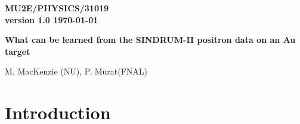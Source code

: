 \documentclass[12pt]{article}
\newcommand {\mumepconv}[1][A] {%
  \def\ArgI{{#1}}%
  \mumepconvRelay
}
\newcommand \mumepconvRelay[1][A]  {\mbox{$\mu^- \textrm{\ArgI} \rightarrow e^+ \textrm{#1}$}}
\begin{document}
\begin{titlepage}
  \begin{flushright}
    \bf {MU2E/PHYSICS/31019} \\
    version 1.0
    \today
  \end{flushright}

  \vspace{1cm}
  
  \begin{center}
    {\Large \bf What can be learned from the SINDRUM-II positron data on an Au target} 
    
    \vspace{1cm}
    
    M. MacKenzie (NU), P. Murat(FNAL)
    
    \vspace{0.3cm}
    
    \vspace{0.8cm}                           
  \end{center}

  \begin{abstract}

    The positron data of the SINDRUM-II experiment on an Au target have
    an interesting feature near the spectrum endpoint.
    We try to understand implications of that for the Mu2e
    search for \mumepconv\ .
    
  \end{abstract}

\end{titlepage}
%
%
%
{\tableofcontents}

% 


\newpage
\section { Introduction}
\end{document}
